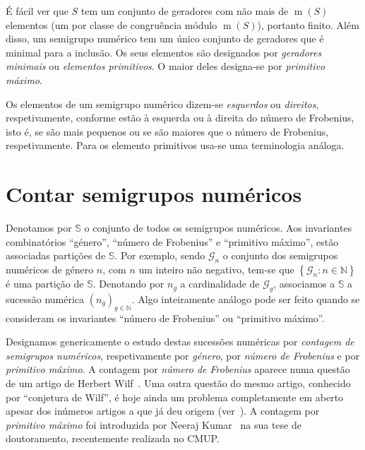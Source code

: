 \documentclass[12pt,a4paper]{article}
\numberwithin{table}{section}
\numberwithin{figure}{section}
\numberwithin{equation}{section}
\DeclareMathOperator{\multiplicityoper}{m} %
\DeclareMathOperator{\genusoper}{g} %
\DeclareMathOperator{\suchthat}{ : } %
\theoremstyle{definition}
\theoremstyle{remark}
\begin{document}

É fácil ver que \(S\) tem um conjunto de geradores com não mais de \(\multiplicityoper(S)\) elementos (um por classe de congruência módulo \(\multiplicityoper(S)\)), portanto finito. Além disso, um semigrupo numérico tem um único conjunto de geradores que é minimal para a inclusão. Os seus elementos são designados por \emph{geradores minimais} ou \emph{elementos primitivos}. O maior deles designa-se por \emph{primitivo máximo}.

Os elementos de um semigrupo numérico dizem-se \emph{esquerdos} ou \emph{direitos}, respetivamente, conforme estão à esquerda ou à direita do número de Frobenius, isto é, se são mais pequenos ou se são maiores que o número de Frobenius, respetivamente. Para os elemento primitivos usa-se uma terminologia análoga.


\section{Contar semigrupos numéricos}\label{sec:contar}
Denotamos por \(\mathbb{S}\) o conjunto de todos os semigrupos numéricos.
Aos invariantes combinatórios ``género'', ``número de Frobenius'' e ``primitivo máximo'', estão associadas partições de \(\mathbb{S}\).
Por exemplo, sendo \(\mathcal{G}_n\) %
o conjunto dos semigrupos numéricos de género \(n\), com \(n\) um inteiro não negativo, tem-se que \(\left\{\mathcal{G}_n\suchthat n\in \mathbb{N}\right\}\) é uma partição de \(\mathbb{S}\). Denotando por \(n_g\) a cardinalidade de \(\mathcal{G}_g\), %
associamos a \(\mathbb{S}\) a sucessão numérica \(\left(n_g\right)_{g\in\mathbb{N}}\). Algo inteiramente análogo pode ser feito quando se consideram os invariantes ``número de Frobenius'' ou ``primitivo máximo''.  


Designamos genericamente o estudo destas sucessões numéricas por \emph{contagem de semigrupos numéricos}, respetivamente por \emph{género}, por \emph{número de Frobenius} e por \emph{primitivo máximo}.
A contagem por \emph{número de Frobenius} aparece numa questão de um artigo de Herbert Wilf~\cite{Wilf1978AMM-circle}. Uma outra questão do mesmo artigo, conhecido por ``conjetura de Wilf'', é hoje ainda um problema completamente em aberto apesar dos inúmeros artigos a que já deu origem (ver~\cite{Delgado2020-survey}).  
A contagem por \emph{primitivo máximo} foi introduzida por Neeraj Kumar~\cite{Kumar2025phd-Numerical} na sua tese de doutoramento, recentemente realizada no CMUP.
\end{document}
